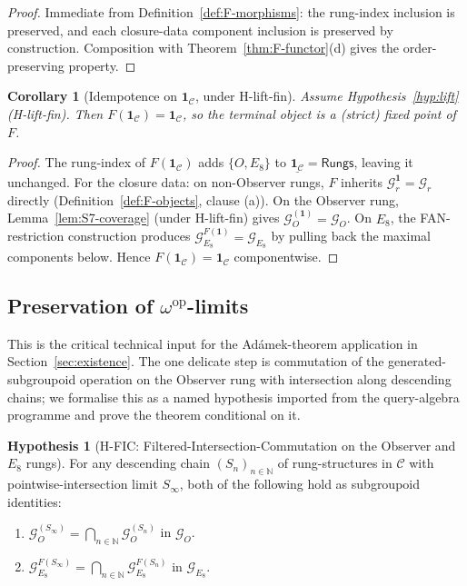 \documentclass[11pt, a4paper]{amsart}
\newtheorem{corollary}[theorem]{Corollary}
\theoremstyle{definition}
\newtheorem{hypothesis}[theorem]{Hypothesis}
\newcommand{\N}{\mathbb{N}}
\newcommand{\Rungs}{\mathsf{Rungs}}
\newcommand{\catC}{\mathcal{C}}
\newcommand{\Gcal}{\mathcal{G}}
\begin{document}
\begin{proof}
Immediate from Definition~\ref{def:F-morphisms}: the rung-index
inclusion is preserved, and each closure-data component inclusion
is preserved by construction. Composition with
Theorem~\ref{thm:F-functor}(d) gives the order-preserving
property.
\end{proof}

\begin{corollary}[Idempotence on $\mathbf{1}_\catC$, under
  H-lift-fin]
\label{cor:terminal-fixed}
Assume Hypothesis~\ref{hyp:lift} (H-lift-fin). Then
$F(\mathbf{1}_\catC) = \mathbf{1}_\catC$, so the terminal
object is a (strict) fixed point of $F$.
\end{corollary}

\begin{proof}
The rung-index of $F(\mathbf{1}_\catC)$ adds $\{O, E_8\}$ to
$\underline{\mathbf{1}_\catC} = \Rungs$, leaving it unchanged.
For the closure data: on non-Observer rungs, $F$ inherits
$\Gcal_r^{\mathbf{1}} = \Gcal_r$ directly
(Definition~\ref{def:F-objects}, clause (a)). On the Observer
rung, Lemma~\ref{lem:S7-coverage} (under H-lift-fin) gives
$\Gcal_O^{(\mathbf{1})} = \Gcal_O$. On $E_8$, the FAN-
restriction construction produces $\Gcal_{E_8}^{F(\mathbf{1})}
= \Gcal_{E_8}$ by pulling back the maximal components below.
Hence $F(\mathbf{1}_\catC) = \mathbf{1}_\catC$ componentwise.
\end{proof}

\subsection{Preservation of $\omega^{\mathrm{op}}$-limits}
\label{subsec:F-omega-limits}

This is the critical technical input for the Ad\'amek-theorem
application in Section~\ref{sec:existence}. The one delicate
step is commutation of the generated-subgroupoid operation on
the Observer rung with intersection along descending chains;
we formalise this as a named hypothesis imported from the
query-algebra programme and prove the theorem conditional on
it.

\begin{hypothesis}[H-FIC: Filtered-Intersection-Commutation on
  the Observer and $E_8$ rungs]
\label{hyp:FIC}
For any descending chain $(S_n)_{n \in \N}$ of rung-structures
in $\catC$ with pointwise-intersection limit $S_\infty$, both
of the following hold as subgroupoid identities:
\begin{enumerate}
\item[(H-FIC-O)]
$\Gcal_O^{(S_\infty)} = \bigcap_{n \in \N} \Gcal_O^{(S_n)}$
in $\Gcal_O$.
\item[(H-FIC-$E_8$)]
$\Gcal_{E_8}^{F(S_\infty)} = \bigcap_{n \in \N}
\Gcal_{E_8}^{F(S_n)}$
in $\Gcal_{E_8}$.
\end{enumerate}
\end{hypothesis}
\end{document}
